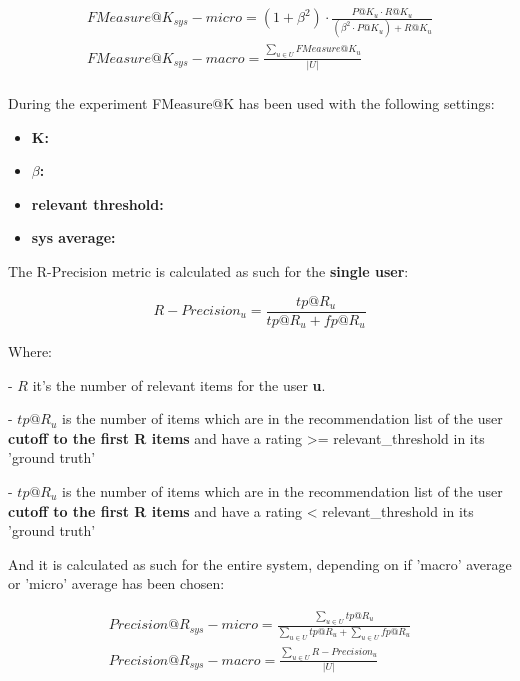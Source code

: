 \documentclass[11pt]{article}
\begin{document}
    \begin{gather*}
        FMeasure@K_{sys} - micro = (1 + \beta^2) \cdot \frac{P@K_u \cdot R@K_u}{(\beta^2 \cdot P@K_u) + R@K_u}\\
        FMeasure@K_{sys} - macro = \frac{\sum_{u \in U} FMeasure@K_u}{|U|}\\
    \end{gather*}

\hfill\break

During the experiment FMeasure@K has been used with the following settings:
\begin{itemize}
    \item \textbf{K: }
    \item  \textbf{$\beta$: }
    \item \textbf{relevant threshold:  }
    \item \textbf{sys average:  }
\end{itemize}


The R-Precision metric is calculated as such for the \textbf{single user}:

    \[
    R-Precision_u = \frac{tp@R_u}{tp@R_u + fp@R_u}
    \]

    Where:

    - $R$ it's the number of relevant items for the user \textbf{u}.

    - $tp@R_u$ is the number of items which are in the recommendation list of the user
      \textbf{cutoff to the first R items} and have a rating >= relevant_threshold in its 'ground truth'

    - $tp@R_u$ is the number of items which are in the recommendation list of the user
      \textbf{cutoff to the first R items} and have a rating < relevant_threshold in its 'ground truth'

\hfill\break

And it is calculated as such for the entire system, depending on if 'macro' average or 'micro' average has been
chosen:

    \begin{gather*}
        Precision@R_{sys} - micro = \frac{\sum_{u \in U} tp@R_u}{\sum_{u \in U} tp@R_u + \sum_{u \in U} fp@R_u}\\
        Precision@R_{sys} - macro = \frac{\sum_{u \in U} R-Precision_u}{|U|}\\
    \end{gather*}
\end{document}
